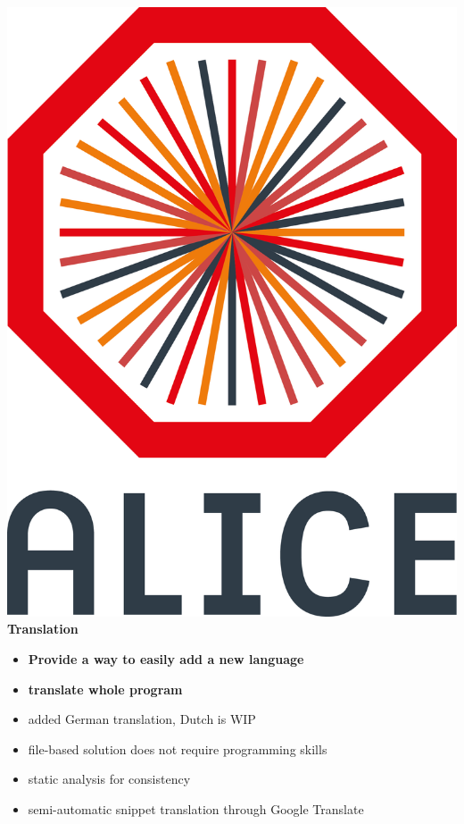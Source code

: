 \documentclass[aspectratio=1610,14pt,dvipsnames]{beamer}
\begin{document}
\begin{frame}{\includegraphics[height=0.07\textheight]{2012-Jul-04-4_Color_Logo_CB.png} \hspace{0.2cm}\textbf{Translation}}
  \begin{itemize}
    \item \textbf{Provide a way to easily add a new language}
    \item \textbf{translate whole program}
    \item added German translation, Dutch is WIP
    \item file-based solution does not require programming skills
    \item static analysis for consistency
    \item semi-automatic snippet translation through Google Translate
  \end{itemize}
\end{frame}
\end{document}
